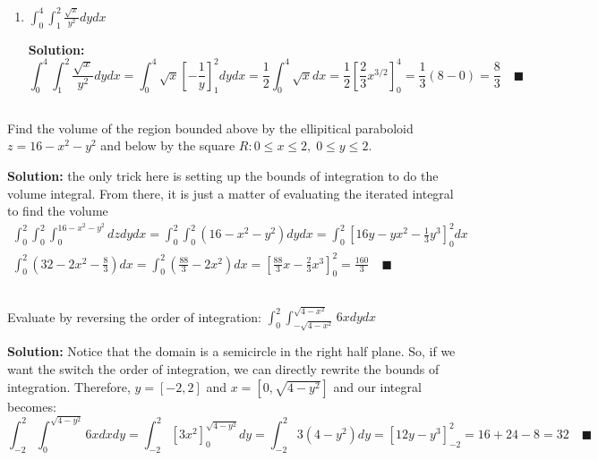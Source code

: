 \documentclass[letterpaper, 11pt]{article}
\begin{document}
\begin{enumerate}[label=(\alph*)]
\item $\int_0^4 \int_1^2 \frac{\sqrt{x}}{y^2} dy dx$
\par \textbf{Solution:}
\[
\int_0^4 \int_1^2 \frac{\sqrt{x}}{y^2} dy dx = 
\int_0^4  \sqrt{x} \left[ -\frac{1}{y}\right]_1^2 dy dx = 
\frac{1}{2} \int_0^4 \sqrt{x} dx = 
\frac{1}{2} \left[\frac{2}{3} x^{3/2} \right]_0^4 = \frac{1}{3}(8 - 0) = \frac{8}{3} \quad\blacksquare
\]

\end{enumerate}

\subsection{} Find the volume of the region bounded above by the ellipitical paraboloid $z = 16 - x^2 - y^2$ and below by the square $R: 0 \leq x \leq 2,\; 0 \leq y \leq 2$.
\par \textbf{Solution:} the only trick here is setting up the bounds of integration to do the volume integral. From there, it is just a matter of evaluating the iterated integral to find the volume
\begin{gather*}
\int_0^2 \int_0^2 \int_0^{16 - x^2 - y^2} dz  dy dx = \int_0^2 \int_0^2 (16 - x^2 - y^2)  dy dx = \int_0^2 \left[16y - yx^2 - \frac{1}{3}y^3  \right]_0^2 dx \\
\int_0^2 \left(32 - 2x^2 - \frac{8}{3}\right) dx = \int_0^2 \left(\frac{88}{3} - 2x^2\right)dx = \left[ \frac{88}{3}x - \frac{2}{3}x^3 \right]_0^2 = \frac{160}{3} \quad\blacksquare
\end{gather*}

\subsection{} Evaluate by reversing the order of integration: $\int_0^2 \int_{-\sqrt{4 - x^2}}^{\sqrt{4 - x^2}} 6x dy dx$
\par \textbf{Solution:} Notice that the domain is a semicircle in the right half plane. So, if we want the switch the order of integration, we can directly rewrite the bounds of integration. Therefore, $y = [-2,2]$ and $x = [0, \sqrt{4 - y^2}]$ and our integral becomes:
\[ \int_{-2}^2 \int_0^{\sqrt{4 - y^2}} 6x dx dy = \int_{-2}^2 \left[ 3x^2 \right]_0^{\sqrt{4 - y^2}} dy = \int_{-2}^2 3(4 - y^2)dy = \left[ 12y - y^3 \right]_{-2}^2 = 16 +24 - 8 = 32 \quad\blacksquare\]

\end{document}
